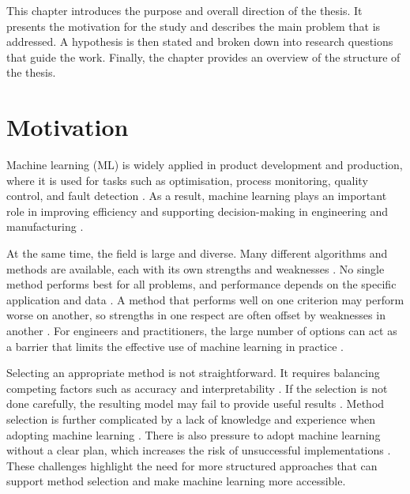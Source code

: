 \label{ch:introduction}

This chapter introduces the purpose and overall direction 
of the thesis. It presents the motivation for the study 
and describes the main problem that is addressed. 
A hypothesis is then stated and broken down into research 
questions that guide the work.
Finally, the chapter provides an overview 
of the structure of the thesis.

\section{Motivation}
\label{sec:motivation}

Machine learning (ML) is widely applied in product development
and production, where it is used for tasks such as optimisation,
process monitoring, quality control, and fault detection
\parencite{wuest2016ml_manufacturing,
dogan2021machine_learning_data_mining_manufacturing}.
As a result, machine learning plays an important role in
improving efficiency and supporting decision-making in
engineering and manufacturing
\parencite{rai2021ml_manufacturing_industry4}.

At the same time, the field is large and diverse. Many different
algorithms and methods are available, each with its own strengths
and weaknesses \parencite{wuest2016ml_manufacturing}.
No single method performs best for all problems, and performance
depends on the specific application and data
\parencite{lee2020machine_learning_enterprises}.
A method that performs well on one criterion may perform worse on
another, so strengths in one respect are often offset by
weaknesses in another
\parencite{ali2017accurate_multi_criteria_decision_making_methodology_recommending_machine_learning_algorithm}.
For engineers and practitioners, the large number of options can
act as a barrier that limits the effective use of machine
learning in practice \parencite{wuest2016ml_manufacturing, adekoya2022applications_ai_em}.

Selecting an appropriate method is not straightforward. It
requires balancing competing factors such as accuracy and
interpretability \parencite{lee2020machine_learning_enterprises}.
If the selection is not done carefully, the resulting model may
fail to provide useful results
\parencite{ali2017accurate_multi_criteria_decision_making_methodology_recommending_machine_learning_algorithm}.
Method selection is further complicated by a lack of knowledge
and experience when adopting machine learning
\parencite{sonntag2023pattern_ml_product_development}.
There is also pressure to adopt machine learning without a clear
plan, which increases the risk of unsuccessful implementations
\parencite{plathottam2023review_ai_manufacturing}.
These challenges highlight the need for more structured
approaches that can support method selection and make machine
learning more accessible.


